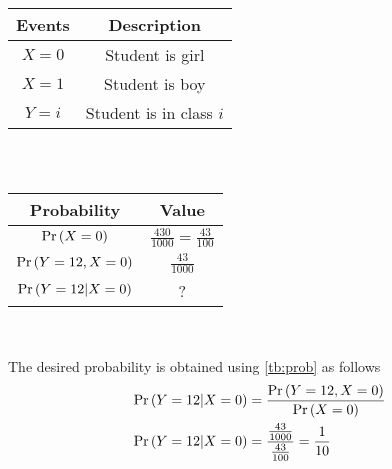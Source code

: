 \documentclass[journal,11pt,twocolumn]{IEEEtran}
\begin{document}
    \begin{table}[h]
        \begin{tabular}{|c|c|}
            \hline
            Events & Description\\
            \hline
            $X=0$ & Student is girl\\
            \hline
            $X=1$ & Student is boy\\
            \hline
            $Y=i$ & Student is in class $i$\\
            \hline
        \end{tabular}\\
        \caption{}
        \label{tb:desc}
    \end{table}
    \begin{table}[h]
        \begin{tabular}{|c|c|}
            \hline
            Probability & Value\\
            \hline
            $\Pr\left(X=0\right)$ & $\frac{430}{1000} = \frac{43}{100}$\\
            \hline
            $\Pr\left(Y=12, X=0\right)$ & $\frac{43}{1000}$\\
            \hline
            $\Pr\left(Y=12 | X=0\right)$ & ?\\
            \hline
        \end{tabular}\\
        \caption{}
        \label{tb:prob}
    \end{table}
    The desired probability is obtained using \autoref{tb:prob} as follows
    \begin{align}
        \Pr\left(Y=12 | X=0\right) &= \frac{\Pr\left(Y=12, X=0\right)}{\Pr\left(X=0\right)}\\
        \Pr\left(Y=12 | X=0\right) &= \frac{\frac{43}{1000}}{\frac{43}{100}} = \frac{1}{10}
    \end{align}
    
    
\end{document}
